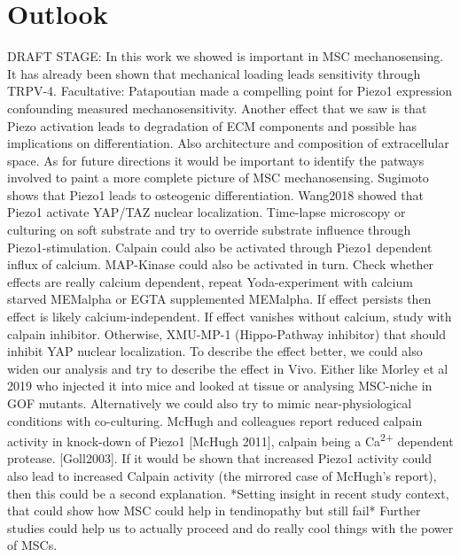\section{Outlook}
DRAFT STAGE: 
In this work we showed \Piezo{} is important in MSC mechanosensing. It has already been shown that mechanical loading leads sensitivity through TRPV-4. Facultative: Patapoutian made a compelling point for Piezo1 expression confounding measured mechanosensitivity. Another effect that we saw is that Piezo activation leads to degradation of ECM components and possible has implications on differentiation. Also architecture and composition of extracellular space.
As for future directions it would be important to identify the patways involved to paint a more complete picture of MSC mechanosensing. Sugimoto shows that Piezo1 leads to osteogenic differentiation. Wang2018 showed that Piezo1 activate YAP/TAZ nuclear localization. Time-lapse microscopy or culturing on soft substrate and try to override substrate influence through Piezo1-stimulation. Calpain could also be activated through Piezo1 dependent influx of calcium. MAP-Kinase could also be activated in turn.  Check whether effects are really calcium dependent, repeat Yoda-experiment with calcium starved MEMalpha or EGTA supplemented MEMalpha. If effect persists then effect is likely calcium-independent. If effect vanishes without calcium, study with calpain inhibitor. Otherwise, XMU-MP-1 (Hippo-Pathway inhibitor) that should inhibit YAP nuclear localization. To describe the effect better, we could also widen our analysis and try to describe the effect in Vivo. Either like Morley et al 2019 who injected it into mice and looked at tissue or analysing MSC-niche in GOF mutants. Alternatively we could also try to mimic near-physiological conditions with co-culturing.
McHugh and colleagues report reduced calpain activity in knock-down of Piezo1 [McHugh 2011], calpain being a Ca\textsuperscript{2+} dependent protease. [Goll2003]. If it would be shown that increased Piezo1 activity could also lead to increased Calpain activity (the mirrored case of McHugh's report), then this could be a second explanation.
*Setting insight in recent study context, that could show how MSC could help in tendinopathy but still fail* Further studies could help us to actually proceed and do really cool things with the power of MSCs. 